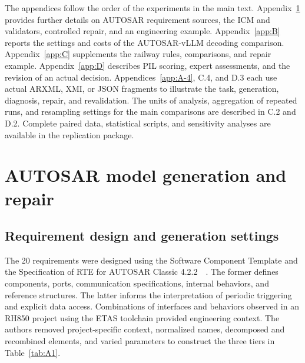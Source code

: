 \documentclass[pdflatex,iicol,sn-mathphys-num]{sn-jnl}
\newcommand{\paperref}[1]{~\citep{#1}}
\begin{document}
\renewcommand{\thetable}{\thesection\arabic{table}}
\renewcommand{\theHtable}{\thesection.\arabic{table}}

The appendices follow the order of the experiments in the main text. Appendix~\ref{app:A} provides further details on AUTOSAR requirement sources, the ICM and validators, controlled repair, and an engineering example. Appendix~\ref{app:B} reports the settings and costs of the AUTOSAR-vLLM decoding comparison. Appendix~\ref{app:C} supplements the railway rules, comparisons, and repair example. Appendix~\ref{app:D} describes PIL scoring, expert assessments, and the revision of an actual decision. Appendices~\ref{app:A-4}, C.4, and D.3 each use actual ARXML, XMI, or JSON fragments to illustrate the task, generation, diagnosis, repair, and revalidation. The units of analysis, aggregation of repeated runs, and resampling settings for the main comparisons are described in C.2 and D.2. Complete paired data, statistical scripts, and sensitivity analyses are available in the replication package.

\FloatBarrier

\setcounter{table}{0}



\section{AUTOSAR model generation and repair}\label{app:A}

\subsection{Requirement design and generation settings}\label{app:A-1}

The 20 requirements were designed using the Software Component Template and the Specification of RTE for AUTOSAR Classic 4.2.2\paperref{AUTOSAR2015SoftwareComponentTemplate422}\paperref{AUTOSAR2015RTE422}. The former defines components, ports, communication specifications, internal behaviors, and reference structures. The latter informs the interpretation of periodic triggering and explicit data access. Combinations of interfaces and behaviors observed in an RH850 project using the ETAS toolchain provided engineering context. The authors removed project-specific context, normalized names, decomposed and recombined elements, and varied parameters to construct the three tiers in Table~\ref{tab:A1}.
\end{document}
